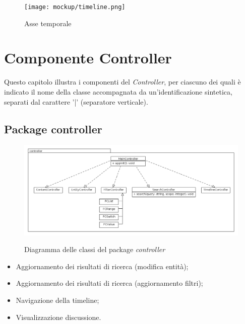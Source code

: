 \documentclass[10pt,a4paper,headinclude,footinclude,hidelinks]{scrreprt} %
\begin{document}
	\begin{figure}[ht]
		\begin{center}
	    	\texttt{[image: mockup/timeline.png]}
			\label{gfx:mockup:timeline:axis}
			\caption{Asse temporale}
		\end{center}
	\end{figure}

	\chapter{Componente Controller}
	\label{ch:stage:design:controller}


	Questo capitolo illustra i componenti del \textit{Controller}, per ciascuno dei quali è indicato il nome della classe accompagnata da un'identificazione sintetica, separati dal carattere '|' (separatore verticale).

	\section{Package controller}
	\label{sec:stage:design:controller}

	\begin{figure}[ht]
		\begin{center}
	    	\includegraphics[width=12cm]{class/controller.png}
			\label{gfx:class:controller}
			\caption{Diagramma delle classi del package \textit{controller}}
		\end{center}
	\end{figure}

	\begin{itemize}
	\item Aggiornamento dei risultati di ricerca (modifica entità);
	\item Aggiornamento dei risultati di ricerca (aggiornamento filtri);
	\item Navigazione della timeline;
	\item Visualizzazione discussione.
	\end{itemize}
\end{document}
